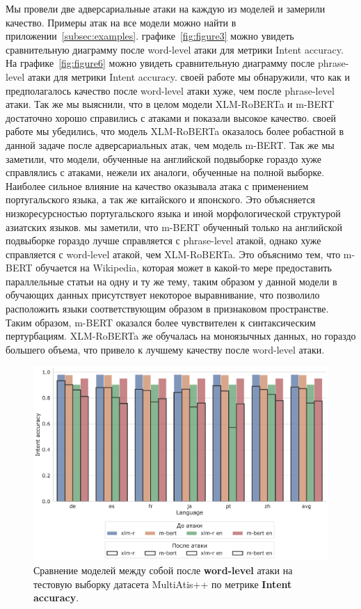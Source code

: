 Мы провели две адверсариальные атаки на каждую из моделей и замерили качество.
Примеры атак на все модели можно найти в приложении~\eqref{subsec:examples}.
 графике~\eqref{fig:figure3} можно увидеть сравнительную диаграмму после word-level атаки для метрики Intent accuracy.
На графике~\eqref{fig:figure6} можно увидеть сравнительную диаграмму после phrase-level атаки для метрики Intent accuracy.
 своей работе мы обнаружили, что как и предполагалось качество после word-level атаки хуже, чем после phrase-level атаки.
Так же мы выяснили, что в целом модели XLM-RoBERTa и m-BERT достаточно хорошо справились с атаками и показали высокое качество.
 своей работе мы убедились, что модель XLM-RoBERTa оказалось более робастной в данной задаче после адверсариальных атак, чем модель m-BERT\@.
Так же мы заметили, что модели, обученные на английской подвыборке гораздо хуже справлялись с атаками, нежели их аналоги, обученные на полной выборке.
Наиболее сильное влияние на качество оказывала атака с применением португальского языка, а так же китайского и японского.
Это объясняется низкоресурсностью португальского языка и иной морфологической структурой азиатских языков.
 мы заметили, что m-BERT обученный только на английской подвыборке гораздо лучше справляется с phrase-level атакой, однако хуже справляется с word-level атакой, чем XLM-RoBERTa.
Это объяснимо тем, что m-BERT обучается на Wikipedia, которая может в какой-то мере предоставить параллельные статьи на одну и ту же тему, таким образом у данной модели в обучающих данных присутствует некоторое выравнивание,
что позволило расположить языки соответствующим образом в признаковом пространстве.
Таким образом, m-BERT оказался более чувствителен к синтаксическим пертурбациям.
XLM-RoBERTa же обучалась на моноязычных данных, но гораздо большего объема, что привело к лучшему качеству после word-level атаки.

\begin{figure}[H]
    \centering
    \includegraphics[width=\textwidth]{images/3}
    \caption{Сравнение моделей между собой после \textbf{word-level} атаки на тестовую выборку датасета MultiAtis++ по метрике \textbf{Intent accuracy}.}\label{fig:figure3}
\end{figure}

